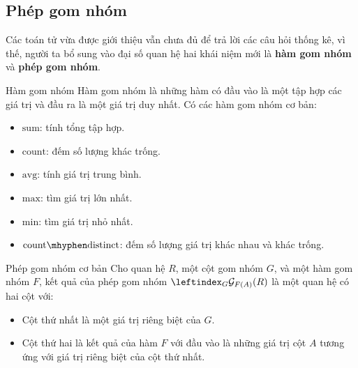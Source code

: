 \documentclass[11pt]{beamer}
\begin{document}
  \subsection{Phép gom nhóm}
  \begin{frame}
    Các toán tử vừa được giới thiệu vẫn chưa đủ để trả lời các câu hỏi thống kê, 
    vì thế, người ta bổ sung vào đại số quan hệ hai khái niệm mới là 
    \textbf{hàm gom nhóm} và \textbf{phép gom nhóm}.
  \end{frame}
  \begin{frame}{Hàm gom nhóm}
    Hàm gom nhóm là những hàm có đầu vào là một tập hợp các giá trị và đầu ra là một giá trị duy nhất.
    Có các hàm gom nhóm cơ bản:
    \begin{itemize}
      \item $\mathrm{sum}$: tính tổng tập hợp.
      \item $\mathrm{count}$: đếm số lượng khác trống.
      \item $\mathrm{avg}$: tính giá trị trung bình.
      \item $\mathrm{max}$: tìm giá trị lớn nhất.
      \item $\mathrm{min}$: tìm giá trị nhỏ nhất.
      \item $\mathrm{count\mhyphen distinct}$: đếm số lượng giá trị khác nhau và khác trống.
    \end{itemize}
  \end{frame}
  \begin{frame}{Phép gom nhóm cơ bản}
    Cho quan hệ $R$, một cột gom nhóm $G$, và một hàm gom nhóm $F$, 
    kết quả của phép gom nhóm $\leftindex_{G}{\mathcal{G}}_{F(A)}(R)$ 
    là một quan hệ có hai cột với:
    \begin{itemize}
      \item Cột thứ nhất là một giá trị riêng biệt của $G$.
      \item Cột thứ hai là kết quả của hàm $F$ với đầu vào là những giá trị cột $A$ 
      tương ứng với giá trị riêng biệt của cột thứ nhất.
    \end{itemize}
  \end{frame}
\end{document}

